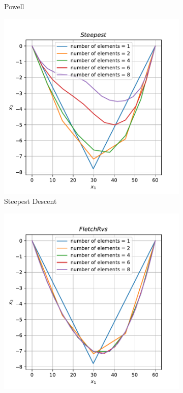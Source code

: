\documentclass[10pt, a4paper]{article}
\begin{document}
\begin{figure}[htpb]
\begin{subfigure}[b]{0.32\textwidth}
    \caption{{\color{red} Powell}}
    \label{fig:q2b_powell}
  \end{subfigure}
  \hfill
  \begin{subfigure}[b]{0.32\textwidth}
    \centering
    \includegraphics[width=\textwidth]{images/q2b_Steepest.pdf}
    \caption{{\color{red} Steepest Descent}}
    \label{fig:q2b_steepest}
  \end{subfigure}
  \hfill
  \begin{subfigure}[b]{0.32\textwidth}
    \centering
    \includegraphics[width=\textwidth]{images/q2b_FletchRvs.pdf}

\end{subfigure}
\end{figure}
\end{document}
